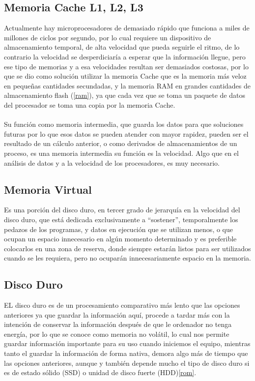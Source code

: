 \documentclass{article}
\begin{document}
	\subsection{Memoria Cache L1, L2, L3}
	Actualmente hay microprocesadores de demasiado rápido que funciona a miles de millones de  ciclos por segundo, por lo cual requiere un dispositivo de almacenamiento temporal, de alta velocidad que pueda seguirle el ritmo, de lo contrario la velocidad se desperdiciaría a esperar que la información llegue, pero ese tipo de memorias y a esa velocidades resultan ser demasiados costosas, por lo que se dio como solución utilizar la memoria Cache que es la memoria más veloz en pequeñas cantidades secundadas, y la memoria RAM en grandes cantidades de almacenamiento flash (\ref{ram}), ya que cada vez que se toma un paquete de datos del procesador se toma una copia por la memoria Cache.\cite{cache}
	\\\\
	Su función como memoria intermedia, que guarda los datos para que soluciones futuras por lo que esos datos se pueden atender con mayor rapidez, pueden ser el resultado de un cálculo anterior,\cite{cache} o como derivados de almacenamientos de un proceso, es una memoria intermedia su función es la velocidad. Algo que en el análisis de datos y a la velocidad de los procesadores, es muy necesario.
	
	\subsection{Memoria Virtual}
	Es una porción del disco duro, en tercer grado de jerarquía en la velocidad del disco duro, que está dedicada exclusivamente a “sostener”, temporalmente los pedazos de los programas, y datos en ejecución que se utilizan menos, o que ocupan un espacio innecesario en algún momento determinado y es preferible colocarlos en una zona de reserva, donde siempre estarán listos para ser utilizados cuando se les requiera, pero no ocuparán innecesariamente espacio en la memoria.
	
	\subsection{Disco Duro}
	EL disco duro es de un procesamiento comparativo más lento que las opciones anteriores ya que guardar la información aquí, procede a tardar más con la intención de conservar la información después de que le ordenador no tenga energía, por lo que se conoce como memoria no volátil, lo cual nos permite guardar información importante para su uso cuando iniciemos el equipo, mientras tanto el guardar la información de forma nativa, demora algo más de tiempo que las opciones anteriores, aunque y también depende mucho el tipo de disco duro si es de estado sólido (SSD) o unidad de disco fuerte (HDD)\ref{rom}.
	
\end{document}
